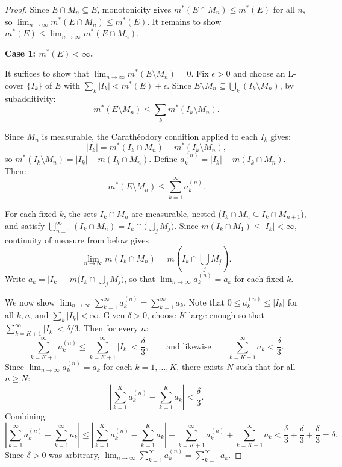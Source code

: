 \documentclass[11pt]{report}
\begin{document}
\begin{proof}
Since $E \cap M_n \subseteq E$, monotonicity gives $m^*(E \cap M_n) \leq m^*(E)$ for all $n$, so $\lim_{n \to \infty} m^*(E \cap M_n) \leq m^*(E)$. It remains to show $m^*(E) \leq \lim_{n \to \infty} m^*(E \cap M_n)$.

\textbf{Case 1: $m^*(E) < \infty$.}

It suffices to show that $\lim_{n \to \infty} m^*(E \setminus M_n) = 0$. Fix $\epsilon > 0$ and choose an L-cover $\{I_k\}$ of $E$ with $\sum_k |I_k| < m^*(E) + \epsilon$. Since $E \setminus M_n \subseteq \bigcup_k (I_k \setminus M_n)$, by subadditivity:
\[
m^*(E \setminus M_n) \leq \sum_k m^*(I_k \setminus M_n).
\]

Since $M_n$ is measurable, the Carath\'{e}odory condition applied to each $I_k$ gives:
\[
|I_k| = m^*(I_k \cap M_n) + m^*(I_k \setminus M_n),
\]
so $m^*(I_k \setminus M_n) = |I_k| - m(I_k \cap M_n)$. Define $a_k^{(n)} = |I_k| - m(I_k \cap M_n)$. Then:
\[
m^*(E \setminus M_n) \leq \sum_{k=1}^{\infty} a_k^{(n)}.
\]

For each fixed $k$, the sets $I_k \cap M_n$ are measurable, nested ($I_k \cap M_n \subseteq I_k \cap M_{n+1}$), and satisfy $\bigcup_{n=1}^{\infty} (I_k \cap M_n) = I_k \cap \bigl(\bigcup_j M_j\bigr)$. Since $m(I_k \cap M_1) \leq |I_k| < \infty$, continuity of measure from below gives
\[
\lim_{n \to \infty} m(I_k \cap M_n) = m\left(I_k \cap \bigcup_j M_j\right).
\]
Write $a_k = |I_k| - m\bigl(I_k \cap \bigcup_j M_j\bigr)$, so that $\lim_{n \to \infty} a_k^{(n)} = a_k$ for each fixed $k$.

We now show $\lim_{n \to \infty} \sum_{k=1}^{\infty} a_k^{(n)} = \sum_{k=1}^{\infty} a_k$. Note that $0 \leq a_k^{(n)} \leq |I_k|$ for all $k, n$, and $\sum_k |I_k| < \infty$. Given $\delta > 0$, choose $K$ large enough so that $\sum_{k=K+1}^{\infty} |I_k| < \delta/3$. Then for every $n$:
\[
\sum_{k=K+1}^{\infty} a_k^{(n)} \leq \sum_{k=K+1}^{\infty} |I_k| < \frac{\delta}{3}, \qquad \text{and likewise} \qquad \sum_{k=K+1}^{\infty} a_k < \frac{\delta}{3}.
\]
Since $\lim_{n \to \infty} a_k^{(n)} = a_k$ for each $k = 1, \ldots, K$, there exists $N$ such that for all $n \geq N$:
\[
\left| \sum_{k=1}^{K} a_k^{(n)} - \sum_{k=1}^{K} a_k \right| < \frac{\delta}{3}.
\]
Combining:
\[
\left| \sum_{k=1}^{\infty} a_k^{(n)} - \sum_{k=1}^{\infty} a_k \right| \leq \left| \sum_{k=1}^{K} a_k^{(n)} - \sum_{k=1}^{K} a_k \right| + \sum_{k=K+1}^{\infty} a_k^{(n)} + \sum_{k=K+1}^{\infty} a_k < \frac{\delta}{3} + \frac{\delta}{3} + \frac{\delta}{3} = \delta.
\]
Since $\delta > 0$ was arbitrary, $\lim_{n \to \infty} \sum_{k=1}^{\infty} a_k^{(n)} = \sum_{k=1}^{\infty} a_k$.


\end{proof}
\end{document}
